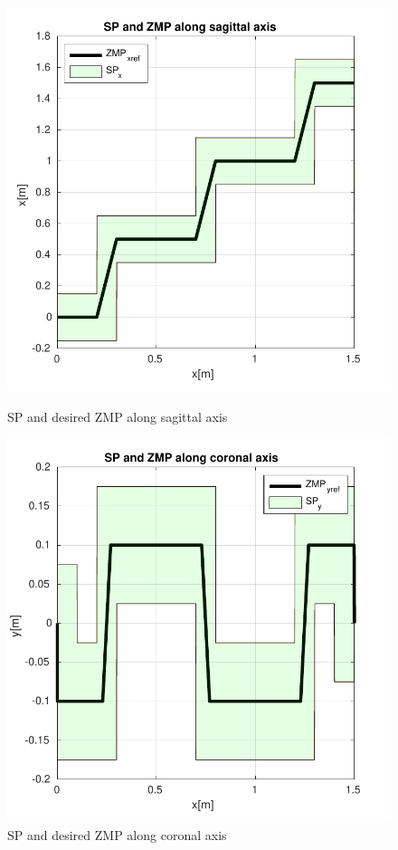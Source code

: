 \documentclass[a4paper]{article}
\begin{document}
\begin{figure}
     \begin{minipage}[b]{0.48\textwidth}
         \centering
         \includegraphics[width=\textwidth]{plot/optimization/SPx.pdf}
         \caption{SP and desired ZMP along sagittal axis}
         \label{fig:SPZMPsagittal}
     \end{minipage}
     \hfill
     \begin{minipage}[b]{0.48\textwidth}
         \centering
         \includegraphics[width=\textwidth]{plot/optimization/SPy.pdf}
         \caption{SP and desired ZMP along coronal axis}
         \label{fig:SPZMPcoronal}
     \end{minipage}       
\end{figure}
\end{document}
